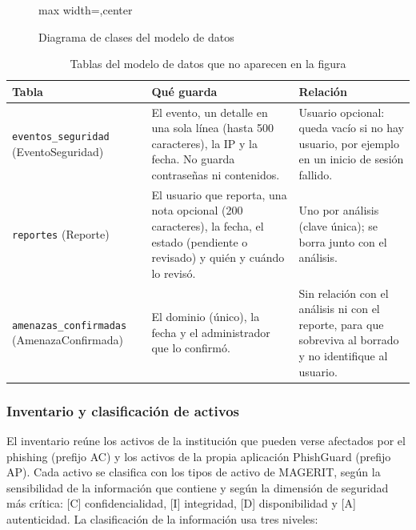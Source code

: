 \documentclass[journal,onecolumn,12pt,draftclsnofoot]{IEEEtran}
\begin{document}
\begin{figure}[htbp]
\begin{adjustbox}{max width=\textwidth,center}
\end{adjustbox}
\caption{Diagrama de clases del modelo de datos}\label{fig:clases}
\end{figure}

\begin{table}[htbp]
\centering
\caption{Tablas del modelo de datos que no aparecen en la figura}\label{tab:tablasnuevas}
\small
\setlength{\tabcolsep}{4pt}
\begin{tabular}{|p{}|p{}|p{}|}
\hline
\textbf{Tabla} & \textbf{Qué guarda} & \textbf{Relación} \\ \hline
\texttt{eventos\_\allowbreak seguridad} (EventoSeguridad) & El evento, un detalle en una sola línea (hasta 500 caracteres), la IP y la fecha. No guarda contraseñas ni contenidos. & Usuario opcional: queda vacío si no hay usuario, por ejemplo en un inicio de sesión fallido. \\ \hline
\texttt{reportes} (Reporte) & El usuario que reporta, una nota opcional (200 caracteres), la fecha, el estado (pendiente o revisado) y quién y cuándo lo revisó. & Uno por análisis (clave única); se borra junto con el análisis. \\ \hline
\texttt{amenazas\_\allowbreak confirmadas} (AmenazaConfirmada) & El dominio (único), la fecha y el administrador que lo confirmó. & Sin relación con el análisis ni con el reporte, para que sobreviva al borrado y no identifique al usuario. \\ \hline
\end{tabular}
\end{table}

\subsubsection{Inventario y clasificación de activos}\label{sec:activos}

El inventario reúne los activos de la institución que pueden verse afectados por el phishing (prefijo AC) y los activos de la propia aplicación PhishGuard (prefijo AP). Cada activo se clasifica con los tipos de activo de MAGERIT, según la sensibilidad de la información que contiene y según la dimensión de seguridad más crítica: [C] confidencialidad, [I] integridad, [D] disponibilidad y [A] autenticidad. La clasificación de la información usa tres niveles:
\end{document}

